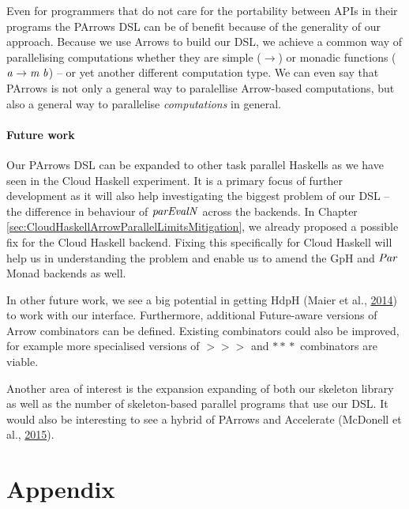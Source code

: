 \documentclass[paper=A4,twoside=true,openright,parskip=full,chapterprefix=true,headings=normal,bibliography=totoc,listof=totoc,titlepage=on,captions=tableabove,draft=false,british]{scrreprt}%
\begin{document}
Even for programmers that do not care for the portability between APIs
in their programs the PArrows DSL can be of benefit because of the
generality of our approach. Because we use Arrows to build our DSL, we
achieve a common way of parallelising computations whether they are
simple (\ensuremath{\to }) or monadic functions (\ensuremath{\Varid{a}\to \Varid{m}\;\Varid{b}}) -- or yet another
different computation type. We can even say that PArrows is not only a
general way to paralellise Arrow-based computations, but also a general
way to parallelise \emph{computations} in general.

\hypertarget{future-work}{%
\subsubsection{Future work}\label{future-work}}

\label{sec:future-work}

Our PArrows DSL can be expanded to other task parallel Haskells as we
have seen in the Cloud Haskell experiment. It is a primary focus of
further development as it will also help investigating the biggest
problem of our DSL -- the difference in behaviour of \ensuremath{\Varid{parEvalN}} across
the backends. In Chapter
\ref{sec:CloudHaskellArrowParallelLimitsMitigation}, we already proposed
a possible fix for the Cloud Haskell backend. Fixing this specifically
for Cloud Haskell will help us in understanding the problem and enable
us to amend the GpH and \ensuremath{\Conid{Par}} Monad backends as well.

In other future work, we see a big potential in getting HdpH (Maier et
al., \protect\hyperlink{ref-Maier:2014:HDS:2775050.2633363}{2014}) to
work with our interface. Furthermore, additional Future-aware versions
of Arrow combinators can be defined. Existing combinators could also be
improved, for example more specialised versions of \ensuremath{\mathbin{>\!\!>\!\!>}} and \ensuremath{\mathbin{*\!*\!*}}
combinators are viable.

Another area of interest is the expansion expanding of both our skeleton
library as well as the number of skeleton-based parallel programs that
use our DSL. It would also be interesting to see a hybrid of PArrows and
Accelerate (McDonell et al.,
\protect\hyperlink{ref-McDonell:2015:TRC:2887747.2804313}{2015}).

\appendix

\hypertarget{appendix}{%
\chapter{Appendix}\label{appendix}}
\end{document}
